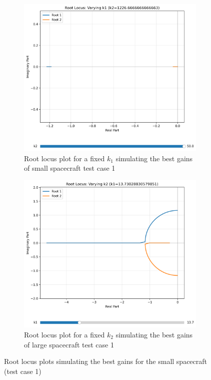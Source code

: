 \documentclass{ifacconf}
\begin{document}
\begin{figure}[H]
    \centering
    \begin{subfigure}[b]{0.48\columnwidth}
        \centering
        \includegraphics[width=\linewidth]{best_gains/root_locus/best_k1_root_locus(2).pdf}
        \caption{Root locus plot for a fixed $k_1$ simulating the best gains of small spacecraft test case 1}
        \label{fig:subfig1}
    \end{subfigure}
    \hfill
    \begin{subfigure}[b]{0.48\columnwidth}
        \centering
        \includegraphics[width=\linewidth]{best_gains/root_locus/best_k2_root_locus(4).pdf}
        \caption{Root locus plot for a fixed $k_2$ simulating the best gains of large spacecraft test case 1}
        \label{fig:subfig2}
    \end{subfigure}
    \caption{Root locus plots simulating the best gains for the small spacecraft (test case 1)}
    \label{fig:combined}
\end{figure}
\end{document}
